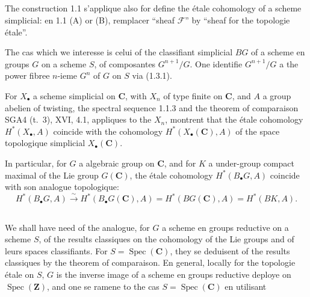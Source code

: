 \documentclass[11pt,a4paper]{article}
\theoremstyle{plain}
\theoremstyle{definition}
\DeclareMathOperator{\Spec}{Spec}
\begin{document}
\subsection{}\label{1.4}

The construction 1.1 s'applique also for define the étale cohomology of a scheme simplicial: en 1.1 (A) or (B), remplacer ``sheaf $\mathscr{F}$'' by ``sheaf for the topologie étale''.

The cas which we interesse is celui of the classifiant simplicial $BG$ of a scheme en groups $G$ on a scheme $S$, of composantes $G^{n+1}/G$. One identifie $G^{n+1}/G$ a the power fibree $n$-ieme $G^n$ of $G$ on $S$ via (1.3.1).

For $X_\bullet$ a scheme simplicial on $\mathbf{C}$, with $X_n$ of type finite on $\mathbf{C}$, and $A$ a group abelien of twisting, the spectral sequence 1.1.3 and the theorem of comparaison SGA4 (t.~3), XVI, 4.1, appliques to the $X_n$, montrent that the étale cohomology $H^*(X_\bullet, A)$ coincide with the cohomology $H^*(X_\bullet(\mathbf{C}), A)$ of the space topologique simplicial $X_\bullet(\mathbf{C})$.

In particular, for $G$ a algebraic group on $\mathbf{C}$, and for $K$ a under-group compact maximal of the Lie group $G(\mathbf{C})$, the étale cohomology $H^*(B_\bullet G, A)$ coincide with son analogue topologique:
\begin{equation}\label{1.4.1}
H^*(B_\bullet G, A) \xrightarrow{\sim} H^*(B_\bullet G(\mathbf{C}), A) = H^*(BG(\mathbf{C}), A) = H^*(BK, A).
\end{equation}

\subsection{}\label{1.5}

We shall have need of the analogue, for $G$ a scheme en groups reductive on a scheme $S$, of the results classiques on the cohomology of the Lie groups and of leurs spaces classifiants. For $S = \Spec(\mathbf{C})$, they se deduisent of the results classiques by the theorem of comparaison. En general, locally for the topologie étale on $S$, $G$ is the inverse image of a scheme en groups reductive deploye on $\Spec(\mathbf{Z})$, and one se ramene to the cas $S = \Spec(\mathbf{C})$ en utilisant
\end{document}
